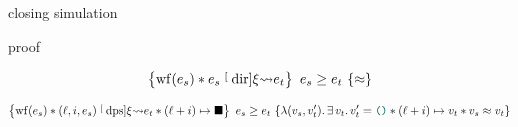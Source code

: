 

%

closing simulation

proof


\begin{theorem}
    \[
        \iRsimvHoare{
            \wf{\datalangExpr_s} \iSep
            \datalangExpr_s \tmcDir{\datalangRenaming} \datalangExpr_t
        }{
            \iSimilar
        }{
            \datalangExpr_s
        }{
            \datalangExpr_t
        }
    \]
\end{theorem}

\begin{theorem}
    \[
        \iRsimvHoare{
            \wf{\datalangExpr_s} \iSep
            (\datalangLoc, \datalangIdx, \datalangExpr_s) \tmcDps{\datalangRenaming} \datalangExpr_t \iSep
            (\datalangLoc + \datalangIdx) \iPointsto \datalangHole
        }{
            \lambdaAbs (\datalangVal_s, \datalangVal_t') \ldotp
            \exists \datalangVal_t \ldotp
            \datalangVal_t' = \datalangUnit \iSep
            (\datalangLoc + \datalangIdx) \iPointsto \datalangVal_t \iSep
            \datalangVal_s \iSimilar \datalangVal_t
        }{
            \datalangExpr_s
        }{
            \datalangExpr_t
        }
    \]
\end{theorem}


